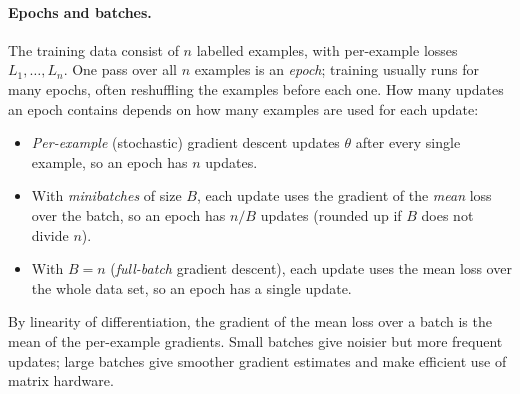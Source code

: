 \documentclass[12pt]{article}
\numberwithin{equation}{section} %
\begin{document}
\paragraph{Epochs and batches.}
The training data consist of $n$ labelled examples, with per-example losses
$L_1,\dots,L_n$. One pass over all $n$ examples is an \emph{epoch}; training
usually runs for many epochs, often reshuffling the examples before each one.
How many updates an epoch contains depends on how many examples are used for
each update:
\begin{itemize}
  \item \emph{Per-example} (stochastic) gradient descent updates $\theta$ after
        every single example, so an epoch has $n$ updates.
  \item With \emph{minibatches} of size $B$, each update uses the gradient of the
        \emph{mean} loss over the batch, so an epoch has $n/B$ updates (rounded
        up if $B$ does not divide $n$).
  \item With $B=n$ (\emph{full-batch} gradient descent), each update uses the
        mean loss over the whole data set, so an epoch has a single update.
\end{itemize}
By linearity of differentiation, the gradient of the mean loss over a batch is
the mean of the per-example gradients. Small batches give noisier but more
frequent updates; large batches give smoother gradient estimates and make
efficient use of matrix hardware.
\end{document}
